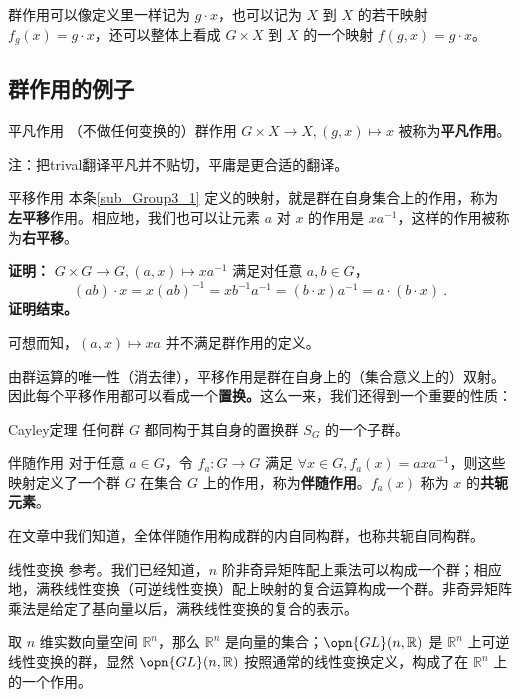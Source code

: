 群作用可以像定义里一样记为 $g\cdot x$，也可以记为 $X$ 到 $X$ 的若干映射 $f_g(x)=g\cdot x$，还可以整体上看成 $G\times X$ 到 $X$ 的一个映射 $f(g, x)=g\cdot x$。

\subsection{群作用的例子}

\begin{example}{平凡作用}\label{ex_Group3_5}
（不做任何变换的）群作用 $G \times X \to X, (g, x) \mapsto x$ 被称为\textbf{平凡作用}。
\end{example}

注：把trival翻译平凡并不贴切，平庸是更合适的翻译。%

\begin{example}{平移作用}\label{ex_Group3_1}
本条\autoref{sub_Group3_1} 定义的映射，就是群在自身集合上的作用，称为\textbf{左平移}作用。相应地，我们也可以让元素 $a$ 对 $x$ 的作用是 $x a^{-1}$，这样的作用被称为\textbf{右平移}。
\end{example}

\textbf{证明：} $G \times G \to G, (a, x) \mapsto x a^{-1}$ 满足对任意 $a, b \in G$，
\begin{equation}
(a b) \cdot x = x (a b)^{-1} = x b^{-1} a^{-1} = (b \cdot x) a^{-1} = a \cdot (b \cdot x) ~.
\end{equation}
\textbf{证明结束。}

可想而知，$(a, x) \mapsto x a$ 并不满足群作用的定义。


由群运算的唯一性（消去律），平移作用是群在自身上的（集合意义上的）双射。因此每个平移作用都可以看成一个\textbf{置换。}这么一来，我们还得到一个重要的性质：

\begin{theorem}{Cayley定理}\label{the_Group3_3}
任何群 $G$ 都同构于其自身的置换群 $S_G$ 的一个子群。
\end{theorem}

\begin{example}{伴随作用}\label{ex_Group3_2}
对于任意 $a\in G$，令 $f_a: G\rightarrow G$ 满足 $\forall x\in G, f_a(x)=axa^{-1}$，则这些映射定义了一个群 $G$ 在集合 $G$ 上的作用，称为\textbf{伴随作用}。$f_a(x)$ 称为 $x$ 的\textbf{共轭元素}。

在文章中我们知道，全体伴随作用构成群的内自同构群，也称共轭自同构群。
\end{example}

\begin{example}{线性变换}\label{ex_Group3_3}
参考。我们已经知道，$n$ 阶非奇异矩阵配上乘法可以构成一个群；相应地，满秩线性变换（可逆线性变换）配上映射的复合运算构成一个群。非奇异矩阵乘法是给定了基向量以后，满秩线性变换的复合的表示。

取 $n$ 维实数向量空间 $\mathbb{R}^n$，那么 $\mathbb{R}^n$ 是向量的集合；$\opn{GL}(n,\mathbb{R})$ 是 $\mathbb{R}^n$ 上可逆线性变换的群，显然 $\opn{GL}(n,\mathbb{R})$ 按照通常的线性变换定义，构成了在 $\mathbb{R}^n$ 上的一个作用。
\end{example}

